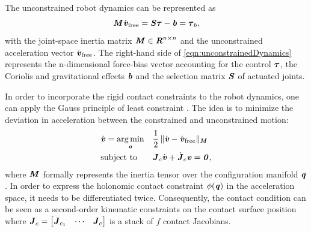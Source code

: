 The unconstrained robot dynamics can be represented as 
\begin{equation}\label{eqn:unconstrainedDynamics}
\bm{\mathit{M}}\dot{\bm{\mathit{v}}}_{\text{free}}=\bm{\mathit{S\tau}}-\bm{\mathit{b}}=\bm{\mathit{\tau}}_b, 
\end{equation}
with the joint-space inertia matrix $\bm{\mathit{M}}\in \bm{\mathit{R}}^{n\times n}$ and the unconstrained acceleration vector $\dot{\bm{\mathit{v}}}_{\text{free}}$. The right-hand side of \cref{eqn:unconstrainedDynamics} represents the n-dimensional force-bias vector accounting for the control $\bm{\mathit{\tau}}$, the Coriolis and gravitational effects $\bm{\mathit{b}}$ and the selection matrix $\bm{\mathit{S}}$ of actuated joints. 

In order to incorporate the rigid contact constraints to the robot dynamics, one can apply the Gauss principle of least constraint \cite{udwadia1992new}. The idea is to minimize the deviation in acceleration between the constrained and unconstrained motion:
\begin{equation}\label{eqn:gaussMinimization}
\begin{aligned} & \dot{\bm{\mathit{v}}} = \underset{\bm{\mathit{a}}}{\arg\min} & & \frac{1}{2}\,\|\dot{\bm{\mathit{v}}}-\dot{\bm{\mathit{v}}}_{\text{free}}\|_{\bm{\mathit{M}}} \\ & \textrm{subject to} & & \bm{\mathit{J}}_{c} \dot{\bm{\mathit{v}}} + \dot{\bm{\mathit{J}}}_c \bm{\mathit{v}} = \bm{\mathit{0}}, \end{aligned}
\end{equation}
where $\bm{\mathit{M}}$ formally represents the inertia tensor over the configuration manifold $\bm{\mathit{q}}$. In order to express the holonomic contact constraint $\phi(\bm{\mathit{q}})$ in the acceleration space, it needs to be differentiated twice. Consequently, the contact condition can be seen as a second-order kinematic constraints on the contact surface position where $\bm{\mathit{J}}_{c}= \begin{bmatrix} \bm{\mathit{J}}_{c_1} & \cdots & \bm{\mathit{J}}_{c}\end{bmatrix}$ is a stack of $f$ contact Jacobians.

